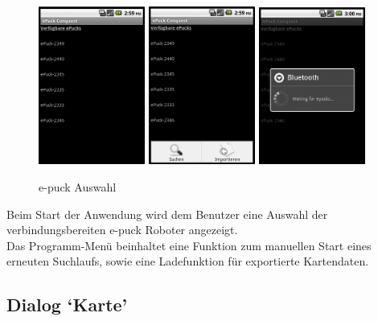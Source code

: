 \documentclass[10pt,a4paper]{article}
\begin{document}
			\begin{figure}[h]
				  \centering
				\includegraphics[width=3.5cm]{screenshots_neu/start.png}
				\includegraphics[width=3.5cm]{screenshots_neu/start_menu.png}
				\includegraphics[width=3.5cm]{screenshots_neu/start_btsuche.png}
  				\caption{e-puck Auswahl}
  			\end{figure}	  				
  			
  				Beim Start der Anwendung wird dem Benutzer eine Auswahl der verbindungsbereiten e-puck Roboter angezeigt.  \\
  				Das Programm-Menü beinhaltet eine Funktion zum manuellen Start eines erneuten Suchlaufs, sowie eine Ladefunktion
  				für exportierte Kartendaten.
			
			\subsection{Dialog `Karte'}
\end{document}
